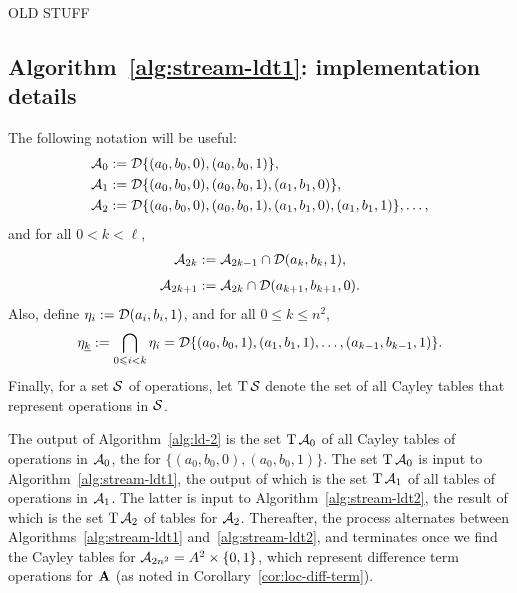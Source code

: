   \newpage





  OLD STUFF
  
  
  
  
  
  \subsection{Algorithm~\ref{alg:stream-ldt1}: implementation details}
  The following notation will be useful:
  \begin{align*}
    \mathcal{A}_0 &:=\mathcal{D} \{(a_0, b_0, 0), (a_0, b_0, 1)\},\\
  \mathcal{A}_1 &:= \mathcal{D}\{(a_0, b_0, 0), (a_0, b_0, 1), (a_1,b_1,0)\},\\
  \mathcal{A}_2 &:= \mathcal{D}\{(a_0, b_0, 0), (a_0, b_0, 1), (a_1,b_1,0), (a_1,b_1,1)\},\dots,
  \end{align*}
  and for all $0< k < \ell$,
  \begin{align*}
  \mathcal{A}_{2k} &:= \mathcal{A}_{2k-1} \cap \mathcal{D} (a_k,b_k,1),\\[4pt]
  \mathcal{A}_{2k+1} &:= \mathcal{A}_{2k} \cap \mathcal{D} (a_{k+1},b_{k+1},0). 
  \end{align*}
  Also, define $\eta_i := \mathcal{D} (a_i, b_i, 1)$, and for all $0\leq k \leq n^2$,
  \[
    \eta_{\underline{k}} := \bigcap_{0\leqslant i < k}\eta_i
      =\mathcal{D} \{(a_0, b_0, 1), (a_1, b_1, 1), \dots, (a_{k-1}, b_{k-1}, 1) \}.
  \]
  Finally, for a set $\mathcal{S}$ of operations, let $\operatorname{T}\mathcal{S}$ denote the set of 
  all Cayley tables that represent operations in $\mathcal{S}$. 
  
  The output of Algorithm~\ref{alg:ld-2} is the set $\operatorname{T} \mathcal{A}_0$ of all 
  Cayley tables of operations in $\mathcal{A}_0$, the \ldtos for $\{(a_0, b_0, 0), (a_0, b_0, 1)\}$.
  The set $\operatorname{T} \mathcal{A}_0$ is input to Algorithm~\ref{alg:stream-ldt1},
  the output of which is the set $\operatorname{T} \mathcal{A}_1$ of all tables of 
  operations in $\mathcal{A}_1$.
  The latter is input to Algorithm~\ref{alg:stream-ldt2}, the result of which is
  the set $\operatorname{T} \mathcal{A}_2$ of tables for $\mathcal{A}_2$.
  Thereafter, the process alternates between
  Algorithms~\ref{alg:stream-ldt1} and~\ref{alg:stream-ldt2}, and 
  terminates once we find the Cayley tables for $\mathcal{A}_{2n^2} = A^2 \times \{0,1\}$,
  which represent difference term operations for $\mathbf{A}$ (as noted
  in Corollary~\ref{cor:loc-diff-term}).
    
